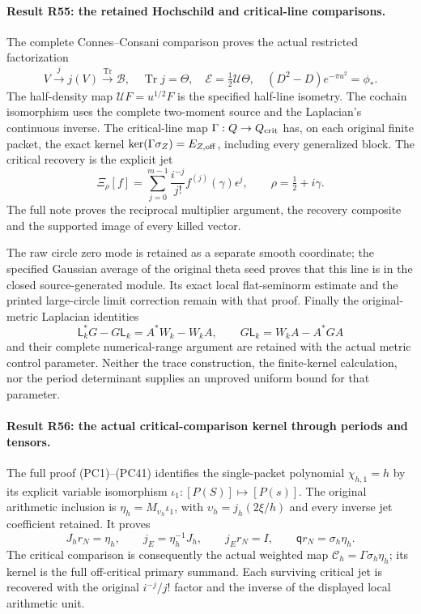 \paragraph{Result R55: the retained Hochschild and critical-line comparisons.}
The complete Connes--Consani comparison proves the actual restricted
factorization
\[
 V\xrightarrow{j}j(V)\xrightarrow{\operatorname{Tr}}\mathscr B,
 \quad \operatorname{Tr}j=\Theta,
 \quad\mathcal E=\tfrac12\mathcal U\Theta,
 \quad (D^2-D)e^{-\pi u^2}=\phi_*.
\]
The half-density map \(\mathcal U F=u^{1/2}F\) is the specified
half-line isometry. The cochain isomorphism uses the complete
two-moment source and the Laplacian's continuous inverse. The
critical-line map \(\Gamma:Q\to Q_{\rm crit}\) has, on each
original finite packet, the exact kernel
\(\ker(\Gamma\sigma_Z)=E_{Z,\rm off}\), including every
generalized block. The critical recovery is the explicit jet
\[
 \Xi_\rho[f]=\sum_{j=0}^{m-1}
      \frac{i^{-j}}{j!}f^{(j)}(\gamma)\epsilon^j,
 \qquad \rho=\tfrac12+i\gamma.
\]
The full note proves the reciprocal multiplier argument, the
recovery composite and the supported image of every killed vector.

The raw circle zero mode is retained as a separate smooth coordinate;
the specified Gaussian average of the original theta seed proves
that this line is in the closed source-generated module. Its exact
local flat-seminorm estimate and the printed large-circle limit
correction remain with that proof. Finally the original-metric
Laplacian identities
\[
 \mathsf L_k^*G-G\mathsf L_k=A^*W_k-W_kA,
 \qquad G\mathsf L_k=W_kA-A^*GA
\]
and their complete numerical-range argument are retained with the
actual metric control parameter. Neither the trace construction,
the finite-kernel calculation, nor the period determinant supplies
an unproved uniform bound for that parameter.


\paragraph{Result R56: the actual critical-comparison kernel through periods and tensors.}
The full proof (PC1)--(PC41) identifies the single-packet polynomial
\(\chi_{h,1}=h\) by its explicit variable isomorphism
\(\iota_1:[P(S)]\mapsto[P(s)]\). The original arithmetic
inclusion is \(\eta_h=M_{\upsilon_h}\iota_1\), with
\(\upsilon_h=j_h(2\xi/h)\) and every inverse jet coefficient
retained. It proves
\[
 J_hr_N=\eta_h,\qquad j_E=\eta_h^{-1}J_h,\qquad
 j_Er_N=I,\qquad \mathsf q r_N=\sigma_h\eta_h.
\]
The critical comparison is consequently the actual weighted map
\(\mathcal C_h=\Gamma\sigma_h\eta_h\); its kernel is the full
off-critical primary summand. Each surviving critical jet is
recovered with the original \(i^{-j}/j!\) factor and the inverse
of the displayed local arithmetic unit.

